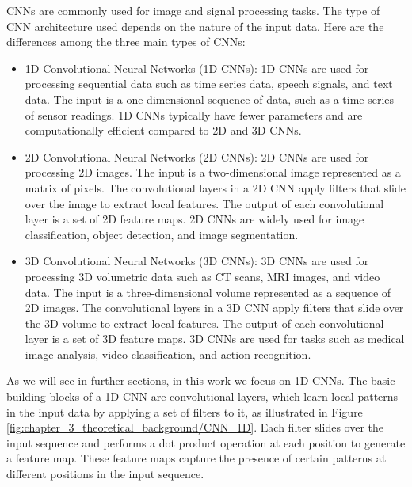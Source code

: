 

\acp{CNN} are commonly used for image and signal processing tasks. The type of CNN architecture used depends on the nature of the input data. Here are the differences among the three main types of \acp{CNN}:

\begin{itemize}
	
	\item 1D Convolutional Neural Networks (1D CNNs): 1D CNNs are used for processing sequential data such as time series data, speech signals, and text data. The input is a one-dimensional sequence of data, such as a time series of sensor readings. 1D CNNs typically have fewer parameters and are computationally efficient compared to 2D and 3D CNNs.
	
	\item 2D Convolutional Neural Networks (2D CNNs): 2D CNNs are used for processing 2D images. The input is a two-dimensional image represented as a matrix of pixels. The convolutional layers in a 2D CNN apply filters that slide over the image to extract local features. The output of each convolutional layer is a set of 2D feature maps. 2D CNNs are widely used for image classification, object detection, and image segmentation.
	
	\item 3D Convolutional Neural Networks (3D CNNs): 3D CNNs are used for processing 3D volumetric data such as CT scans, MRI images, and video data. The input is a three-dimensional volume represented as a sequence of 2D images. The convolutional layers in a 3D CNN apply filters that slide over the 3D volume to extract local features. The output of each convolutional layer is a set of 3D feature maps. 3D CNNs are used for tasks such as medical image analysis, video classification, and action recognition.
\end{itemize}

As we will see in further sections, in this work we focus on 1D CNNs. The basic building blocks of a 1D CNN are convolutional layers, which learn local patterns in the input data by applying a set of filters to it, as illustrated in Figure \ref{fig:chapter_3_theoretical_background/CNN_1D}. Each filter slides over the input sequence and performs a dot product operation at each position to generate a feature map. These feature maps capture the presence of certain patterns at different positions in the input sequence. 
 
